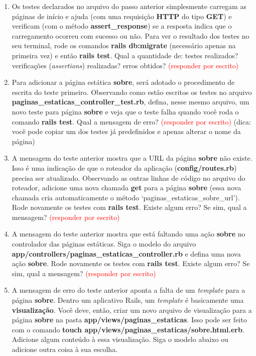 \documentclass[a4paper,12pt]{article}
\begin{document}
\begin{enumerate}
  \item Os testes declarados no arquivo do passo anterior simplesmente carregam as páginas de início e ajuda (com uma requisição \textbf{HTTP} do tipo \textbf{GET}) e verificam (com o método \textbf{assert\_response}) se a resposta indica que o carregamento ocorreu com sucesso ou não. Para ver o resultado dos testes no seu terminal, rode os comandos \textbf{rails db:migrate} (necessário apenas na primeira vez) e então \textbf{rails test}. Qual a quantidade de: testes realizados? verificações (\textit{assertions}) realizadas? erros obtidos? \textcolor{red}{(responder por escrito)}
  \item Para adicionar a página estática \textbf{sobre}, será adotado o procedimento de escrita do teste primeiro. Observando como estão escritos os testes no arquivo \textbf{paginas\_estaticas\_controller\_test.rb}, defina, nesse mesmo arquivo, um novo teste para página \textbf{sobre} e veja que o teste falha quando você roda o comando \textbf{rails test}. Qual a mensagem de erro? \textcolor{red}{(responder por escrito)} (dica: você pode copiar um dos testes já predefinidos e apenas alterar o nome da página)
  \item A mensagem do teste anterior mostra que a URL da página \textbf{sobre} não existe. Isso é uma indicação de que o roteador da aplicação (\textbf{config/routes.rb}) precisa ser atualizado. Observando as outras linhas de código no arquivo do roteador, adicione uma nova chamada \textbf{get} para a página \textbf{sobre} (essa nova chamada cria automaticamente o método `paginas\_estaticas\_sobre\_url'). Rode novamente os testes com \textbf{rails test}. Existe algum erro? Se sim, qual a mensagem? \textcolor{red}{(responder por escrito)}
  \item A mensagem do teste anterior mostra que está faltando uma ação \textbf{sobre} no controlador das páginas estáticas. Siga o modelo do arquivo \textbf{app/controllers/paginas\_estaticas\_controller.rb} e defina uma nova ação \textbf{sobre}. Rode novamente os testes com \textbf{rails test}. Existe algum erro? Se sim, qual a mensagem? \textcolor{red}{(responder por escrito)}
  \item A mensagem de erro do teste anterior aponta a falta de um \textit{template} para a página \textbf{sobre}. Dentro um aplicativo Rails, um \textit{template} é basicamente uma \textbf{visualização}. Você deve, então, criar um novo arquivo de visualização para a página \textbf{sobre} na pasta \textbf{app/views/paginas\_estaticas}. Isso pode ser feito com o comando \textbf{touch app/views/paginas\_estaticas/sobre.html.erb}. Adicione algum conteúdo à essa visualização. Siga o modelo abaixo ou adicione outra coisa à sua escolha.


\end{enumerate}
\end{document}
